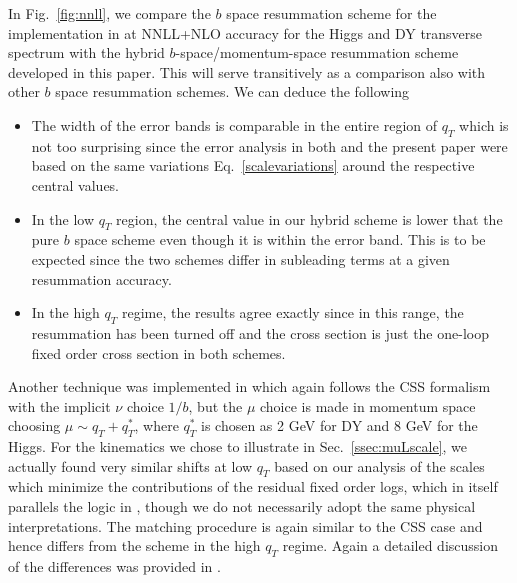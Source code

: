 \documentclass[a4,letterpaper,11pt]{article}
\newcommand{\eq}[1]{Eq.~\eqref{#1}}
\newcommand{\ssec}[1]{Sec.~\ref{ssec:#1}}
\newcommand{\fig}[1]{Fig.~\ref{fig:#1}}
\begin{document}
In \fig{nnll}, we compare the $b$ space resummation scheme for the implementation in \cite{Neill:2015roa}  at NNLL+NLO accuracy for the Higgs and DY transverse spectrum with the hybrid $b$-space/momentum-space resummation scheme developed in this paper. This will serve transitively as a comparison also with other $b$ space resummation schemes. We can deduce the following 
\begin{itemize}
\item
The width of the error bands is comparable in the entire region of $q_T$ which is not too surprising since the error analysis in both \cite{Neill:2015roa} and the present paper were based on the same variations \eq{scalevariations} around the respective central values.
\item
In the low $q_T$ region, the central value in our hybrid scheme is lower that the pure $b$ space scheme even though it is within the error band. This is to be expected since the two schemes differ in subleading terms at a given resummation accuracy.
\item
In the high $q_T$ regime, the results agree exactly since in this range, the resummation has been turned off and the cross section is just the one-loop fixed order cross section in both schemes. 
\end{itemize}
 

Another technique was implemented in \cite{Becher:2011xn,Becher:2012yn} which again follows the CSS formalism with the implicit $\nu$ choice $1/b$, but the $\mu$ choice is made in momentum space choosing $\mu \sim q_T+q_T^*$,  where $q_T^*$ is chosen as 2 GeV for DY and 8 GeV for the Higgs. For the kinematics we chose to illustrate in \ssec{muLscale}, we actually found very similar shifts at low $q_T$ based on our analysis of the scales which minimize the contributions of the residual fixed order logs, which in itself parallels the logic in \cite{Becher:2011xn,Becher:2012yn}, though we do not necessarily adopt the same physical interpretations. The matching procedure is again similar to the CSS case and hence differs from the scheme in \cite{Neill:2015roa} the high $q_T$ regime. Again a detailed discussion of the differences was provided in \cite{Neill:2015roa}.
\end{document}
